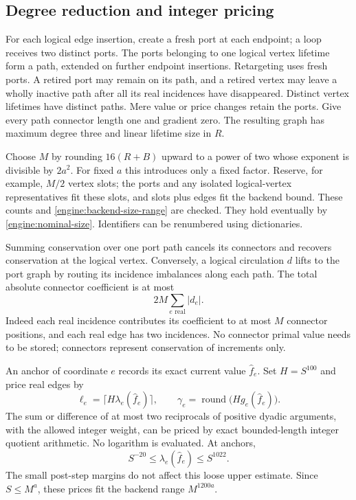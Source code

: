 \subsection{Degree reduction and integer pricing}\label{engine:pricing}

For each logical edge insertion, create a fresh port at each endpoint;
a loop receives two distinct ports.  The ports belonging to one logical
vertex lifetime form a path, extended on further endpoint insertions.
Retargeting uses fresh ports.  A retired port may remain on its path, and
a retired vertex may leave a wholly inactive path after all its real
incidences have disappeared.  Distinct vertex lifetimes have distinct
paths.  Mere value or price changes retain the ports.  Give every path
connector length one and gradient zero.  The resulting graph has maximum
degree three and linear lifetime size in $R$.

Choose $M$ by rounding $16(R+B)$ upward to a power of two whose exponent
is divisible by $2a^2$.  For fixed $a$ this introduces only a fixed
factor.  Reserve, for example, $M/2$ vertex slots; the ports and any
isolated logical-vertex representatives fit these slots, and slots plus
edges fit the backend bound.  These counts and
\eqref{engine:backend-size-range} are checked.  They hold eventually by
\eqref{engine:nominal-size}.  Identifiers can be renumbered using
dictionaries.

Summing conservation over one port path cancels its connectors and
recovers conservation at the logical vertex.  Conversely, a logical
circulation $d$ lifts to the port graph by routing its incidence
imbalances along each path.  The total absolute connector coefficient is
at most
\begin{equation}\label{engine:connector-cost}
                   2M\sum_{e\text{ real}}|d_e|.
\end{equation}
Indeed each real incidence contributes its coefficient to at most $M$
connector positions, and each real edge has two incidences.  No connector
primal value needs to be stored; connectors represent conservation of
increments only.

An anchor of coordinate $e$ records its exact current value
$\widehat f_e$.  Set $H=S^{100}$ and price real edges by
\begin{equation}\label{engine:integer-prices}
  \ell_e=\bigl\lceil H\lambda_e(\widehat f_e)\bigr\rceil,
  \qquad
  \gamma_e=\operatorname{round}\bigl(Hg_e(\widehat f_e)\bigr).
\end{equation}
The sum or difference of at most two reciprocals of positive dyadic
arguments, with the allowed integer weight, can be priced by exact
bounded-length integer quotient arithmetic.  No logarithm is evaluated.
At anchors,
\begin{equation}\label{engine:derivative-range}
             S^{-20}\le\lambda_e(\widehat f_e)\le S^{1022}.
\end{equation}
The small post-step margins do not affect this loose upper estimate.
Since $S\le M^a$, these prices fit the backend range $M^{1200a}$.

